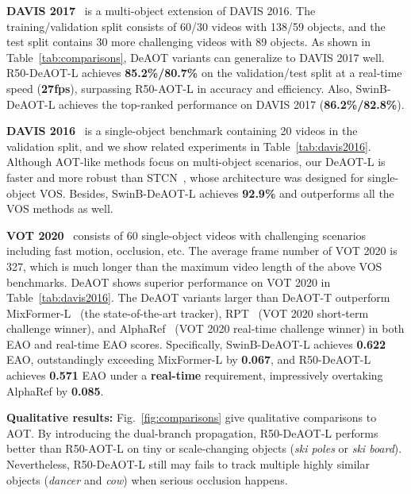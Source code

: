 \documentclass{article}
\begin{document}
\noindent \textbf{DAVIS 2017}~\cite{davis2017} is a multi-object extension of DAVIS 2016. The training/validation split consists of 60/30 videos with 138/59 objects, and the test split contains 30 more challenging videos with 89 objects. As shown in Table~\ref{tab:comparisons}, DeAOT variants can generalize to DAVIS 2017 well. R50-DeAOT-L achieves \textbf{85.2\%/80.7\%} on the validation/test split at a real-time speed (\textbf{27fps}), surpassing R50-AOT-L in accuracy and efficiency. Also, SwinB-DeAOT-L achieves the top-ranked performance on DAVIS 2017 (\textbf{86.2\%/82.8\%}).



\noindent \textbf{DAVIS 2016}~\cite{davis2016} is a single-object benchmark containing 20 videos in the validation split, and we show related experiments in Table~\ref{tab:davis2016}. Although AOT-like methods focus on multi-object scenarios, our DeAOT-L is faster and more robust than STCN~\cite{cheng2021stcn}, whose architecture was designed for single-object VOS. Besides, SwinB-DeAOT-L achieves \textbf{92.9\%} and outperforms all the VOS methods as well.



\noindent \textbf{VOT 2020}~\cite{vot2020} consists of 60 single-object videos with challenging scenarios including fast motion, occlusion, etc. The average frame number of VOT 2020 is 327, which is much longer than the maximum video length of the above VOS benchmarks. DeAOT shows superior performance on VOT 2020 in Table~\ref{tab:davis2016}. The DeAOT variants larger than DeAOT-T outperform MixFormer-L~\cite{mixformer} (the state-of-the-art tracker), RPT~\cite{rpt} (VOT 2020 short-term challenge winner), and AlphaRef~\cite{alpharef} (VOT 2020 real-time challenge winner) in both EAO and real-time EAO scores. Specifically, SwinB-DeAOT-L achieves \textbf{0.622} EAO, outstandingly exceeding MixFormer-L by \textbf{0.067}, and R50-DeAOT-L achieves \textbf{0.571} EAO under a \textbf{real-time} requirement, impressively overtaking AlphaRef by \textbf{0.085}.

\noindent \textbf{Qualitative results:} Fig.~\ref{fig:comparisons} give qualitative comparisons to AOT. By introducing the dual-branch propagation, R50-DeAOT-L performs better than R50-AOT-L on tiny or scale-changing objects (\textit{ski poles} or \textit{ski board}). Nevertheless, R50-DeAOT-L still may fails to track multiple highly similar objects (\textit{dancer} and \textit{cow}) when serious occlusion happens.
\end{document}
